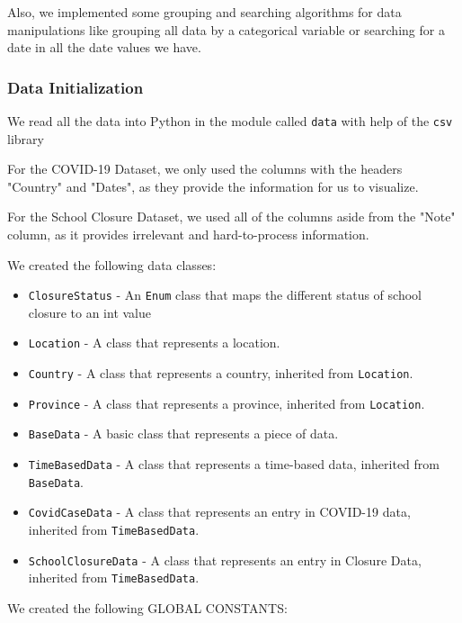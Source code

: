 \documentclass[fontsize=11pt]{article}
\begin{document}
    Also, we implemented some grouping and searching algorithms for data manipulations like grouping all data by a categorical variable or searching for a date in all the date values we have.

    \subsubsection{Data Initialization}

    We read all the data into Python in the module called \verb|data| with help of the \verb|csv| library 

    For the COVID-19 Dataset, we only used the columns with the headers "Country" and "Dates", as they provide the information for us to visualize.

    For the School Closure Dataset, we used all of the columns aside from the "Note" column, as it provides irrelevant and hard-to-process information.

    We created the following data classes:

    \begin{itemize}
        \item \verb|ClosureStatus| - An \verb|Enum| class that maps the different status of school closure to an int value
        \item \verb|Location| - A class that represents a location.
        \item \verb|Country| - A class that represents a country, inherited from \verb|Location|.
        \item \verb|Province| - A class that represents a province, inherited from \verb|Location|.
        \item \verb|BaseData| - A basic class that represents a piece of data.
        \item \verb|TimeBasedData| - A class that represents a time-based data, inherited from \verb|BaseData|.
        \item \verb|CovidCaseData| - A class that represents an entry in COVID-19 data, inherited from \verb|TimeBasedData|.
        \item \verb|SchoolClosureData| - A class that represents an entry in Closure Data, inherited from \verb|TimeBasedData|.
    \end{itemize}

    We created the following GLOBAL CONSTANTS:
\end{document}

